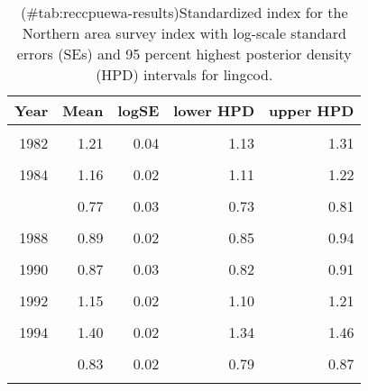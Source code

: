 \begin{table}

\caption{(\#tab:reccpuewa-results)Standardized index for the Northern area survey index with log-scale standard errors (SEs) and 95 percent highest posterior density (HPD) intervals for lingcod.}
\centering
\begin{tabular}[t]{rrrrr}
\toprule
Year & Mean & logSE & lower HPD & upper HPD\\
\midrule
\cellcolor{gray!6}{1981} & \cellcolor{gray!6}{1.17} & \cellcolor{gray!6}{0.05} & \cellcolor{gray!6}{1.07} & \cellcolor{gray!6}{1.29}\\
1982 & 1.21 & 0.04 & 1.13 & 1.31\\
\cellcolor{gray!6}{1983} & \cellcolor{gray!6}{1.04} & \cellcolor{gray!6}{0.04} & \cellcolor{gray!6}{0.97} & \cellcolor{gray!6}{1.12}\\
1984 & 1.16 & 0.02 & 1.11 & 1.22\\
\cellcolor{gray!6}{1985} & \cellcolor{gray!6}{0.86} & \cellcolor{gray!6}{0.03} & \cellcolor{gray!6}{0.82} & \cellcolor{gray!6}{0.91}\\
\addlinespace
1986 & 0.77 & 0.03 & 0.73 & 0.81\\
\cellcolor{gray!6}{1987} & \cellcolor{gray!6}{0.89} & \cellcolor{gray!6}{0.02} & \cellcolor{gray!6}{0.85} & \cellcolor{gray!6}{0.93}\\
1988 & 0.89 & 0.02 & 0.85 & 0.94\\
\cellcolor{gray!6}{1989} & \cellcolor{gray!6}{1.06} & \cellcolor{gray!6}{0.02} & \cellcolor{gray!6}{1.01} & \cellcolor{gray!6}{1.11}\\
1990 & 0.87 & 0.03 & 0.82 & 0.91\\
\addlinespace
\cellcolor{gray!6}{1991} & \cellcolor{gray!6}{0.91} & \cellcolor{gray!6}{0.03} & \cellcolor{gray!6}{0.86} & \cellcolor{gray!6}{0.95}\\
1992 & 1.15 & 0.02 & 1.10 & 1.21\\
\cellcolor{gray!6}{1993} & \cellcolor{gray!6}{1.27} & \cellcolor{gray!6}{0.02} & \cellcolor{gray!6}{1.21} & \cellcolor{gray!6}{1.33}\\
1994 & 1.40 & 0.02 & 1.34 & 1.46\\
\cellcolor{gray!6}{1995} & \cellcolor{gray!6}{0.94} & \cellcolor{gray!6}{0.02} & \cellcolor{gray!6}{0.90} & \cellcolor{gray!6}{0.98}\\
\addlinespace
1996 & 0.83 & 0.02 & 0.79 & 0.87\\
\cellcolor{gray!6}{1997} & \cellcolor{gray!6}{0.84} & \cellcolor{gray!6}{0.02} & \cellcolor{gray!6}{0.80} & \cellcolor{gray!6}{0.89}\\

\end{tabular}
\end{table}
